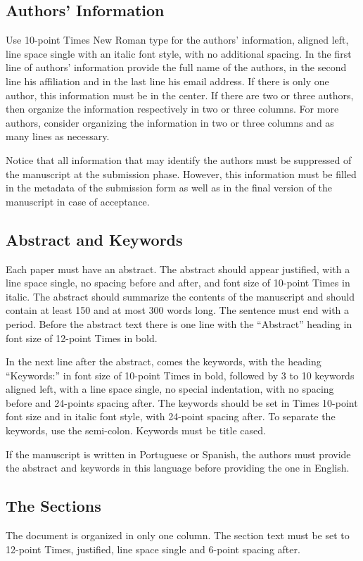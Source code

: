 \documentclass[english,brazilian]{RBIEarticle} %
\begin{document}
\subsection{Authors’ Information}
Use 10-point Times New Roman type for the authors’ information, aligned left, line space single with an italic font style, with no additional spacing. In the first line of authors’ information provide the full name of the authors, in the second line his affiliation and in the last line his email address. If there is only one author, this information must be in the center. If there are two or three authors, then organize the information respectively in two or three columns. For more authors, consider organizing the information in two or three columns and as many lines as necessary.

Notice that all information that may identify the authors must be suppressed of the manuscript at the submission phase. However, this information must be filled in the metadata of the submission form as well as in the final version of the manuscript in case of acceptance.


\subsection{Abstract and Keywords}
Each paper must have an abstract. The abstract should appear justified, with a line space single, no spacing before and after, and font size of 10-point Times in italic. The abstract should summarize the contents of the manuscript and should contain at least 150 and at most 300 words long. The sentence must end with a period. Before the abstract text there is one line with the ``Abstract'' heading in font size of 12-point Times in bold.

In the next line after the abstract, comes the keywords, with the heading ``Keywords:'' in font size of 10-point Times in bold, followed by 3 to 10 keywords aligned left, with a line space single, no special indentation, with no spacing before and 24-points spacing after. The keywords should be set in Times 10-point font size and in italic font style, with 24-point spacing after. To separate the keywords, use the semi-colon. Keywords must be title cased.

If the manuscript is written in Portuguese or Spanish, the authors must provide the abstract and keywords in this language before providing the one in English.


\subsection{The Sections}
The document is organized in only one column. The section text must be set to 12-point Times, justified, line space single and 6-point spacing after.
\end{document}
